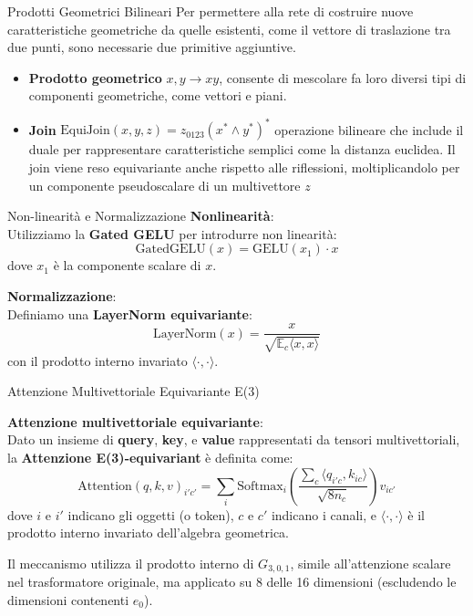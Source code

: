\begin{frame}{Prodotti Geometrici Bilineari}
    Per permettere alla rete di costruire nuove caratteristiche geometriche da quelle 
    esistenti, come il vettore di traslazione tra due punti, sono necessarie due 
    primitive aggiuntive. 
    \begin{itemize}
        \item \textbf{Prodotto geometrico} \(x, y \rightarrow xy \), consente di mescolare fa 
        loro diversi tipi di componenti geometriche, come vettori e piani.
        \item \textbf{Join} \( \text{EquiJoin}(x,y,z) = z_{0123}(x^* \wedge y^*)^* \) operazione bilineare 
        che include il duale per rappresentare caratteristiche semplici come la distanza 
        euclidea. Il join viene reso equivariante anche rispetto alle riflessioni, 
        moltiplicandolo per un componente pseudoscalare di un multivettore \(z\)
    \end{itemize}
\end{frame}

\begin{frame}{Non-linearità e Normalizzazione}
    \textbf{Nonlinearità}: \\
    Utilizziamo la \textbf{Gated GELU} per introdurre non linearità: 
    \[
    \text{GatedGELU}(x) = \text{GELU}(x_1) \cdot x
    \]
    dove \(x_1\) è la componente scalare di \(x\).

    \textbf{Normalizzazione}: \\
    Definiamo una \textbf{LayerNorm equivariante}:
    \[
    \text{LayerNorm}(x) = \frac{x}{\sqrt{\mathbb{E}_c \langle x, x \rangle}}
    \]
    con il prodotto interno invariato \(\langle \cdot, \cdot \rangle\).

\end{frame}

\begin{frame}{Attenzione Multivettoriale Equivariante E(3)} 
    
\textbf{Attenzione multivettoriale equivariante}: \\
Dato un insieme di \textbf{query}, \textbf{key}, e \textbf{value} rappresentati 
da tensori multivettoriali, la \textbf{Attenzione E(3)-equivariant} è definita come:
\[
\text{Attention}(q, k, v)_{i' c'} = \sum_{i} \text{Softmax}_i 
\left( \frac{\sum_c\langle q_{i'c}, k_{ic} \rangle}{\sqrt{8n_c}} \right) v_{ic'}
\]
dove \(i\) e \(i'\) indicano gli oggetti (o token), \(c\) e \(c'\) indicano i canali, 
e \(\langle \cdot, \cdot \rangle\) è il prodotto interno invariato dell'algebra geometrica.

Il meccanismo utilizza il prodotto interno di \(G_{3,0,1}\), simile all'attenzione scalare 
nel trasformatore originale, ma applicato su 8 delle 16 dimensioni 
(escludendo le dimensioni contenenti \(e_0\)).

\end{frame}

